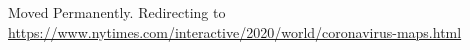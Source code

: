 Moved Permanently. Redirecting to
\url{https://www.nytimes.com/interactive/2020/world/coronavirus-maps.html}
